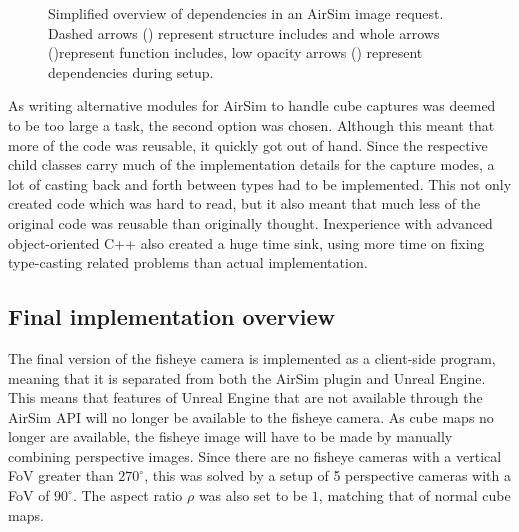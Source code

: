 \begin{figure}[!htb]
    \caption{Simplified overview of dependencies in an AirSim image request. Dashed arrows (\protect\drawdashedarrow) represent structure includes and whole arrows (\protect\drawarrow)represent function includes, low opacity arrows (\protect\drawopacitydarrow) represent dependencies during setup.}
    \label{fig:comm_pattern_camera_request}
\end{figure}

As writing alternative modules for AirSim to handle cube captures was deemed to be too large a task, the second option was chosen. Although this meant that more of the code was reusable, it quickly got out of hand. Since the respective child classes carry much of the implementation details for the capture modes, a lot of casting back and forth between types had to be implemented. This not only created code which was hard to read, but it also meant that much less of the original code was reusable than originally thought. Inexperience with advanced object-oriented C++ also created a huge time sink, using more time on fixing type-casting related problems than actual implementation.

\subsection{Final implementation overview} \label{subsec:Fisheye_impl_overview}

The final version of the fisheye camera is implemented as a client-side program, meaning that it is separated from both the AirSim plugin and Unreal Engine. This means that features of Unreal Engine that are not available through the AirSim API will no longer be available to the fisheye camera. As cube maps no longer are available, the fisheye image will have to be made by manually combining perspective images. Since there are no fisheye cameras with a vertical FoV greater than $270^\circ$, this was solved by a setup of 5 perspective cameras with a FoV of $90^\circ$. The aspect ratio $\rho$ was also set to be $1$, matching that of normal cube maps. 

